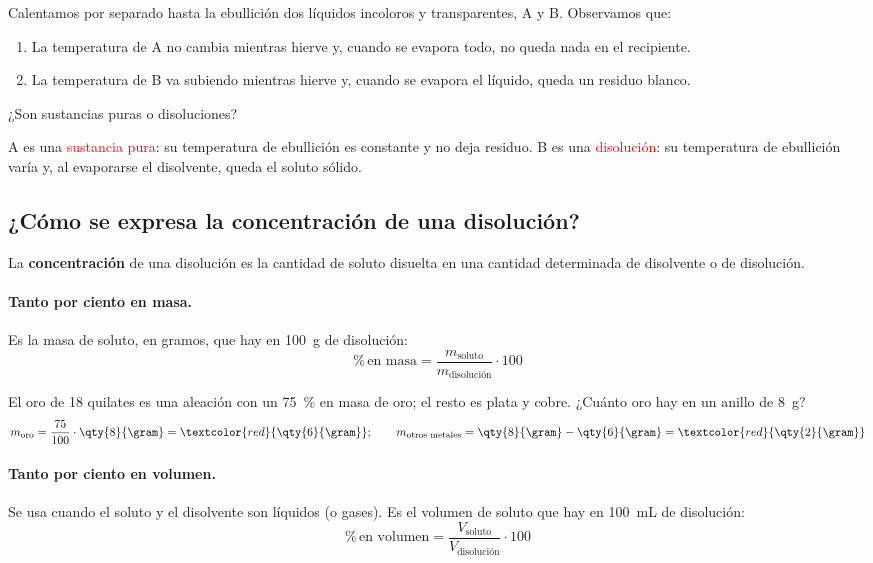 \begin{exercise}
    Calentamos por separado hasta la ebullición dos líquidos incoloros y transparentes, A y B. Observamos que:
    \begin{enumerate}[label=\arabic*.]
        \item La temperatura de A no cambia mientras hierve y, cuando se evapora todo, no queda nada en el recipiente.
        \item La temperatura de B va subiendo mientras hierve y, cuando se evapora el líquido, queda un residuo blanco.
    \end{enumerate}
    ¿Son sustancias puras o disoluciones?
    \begin{solu}
        A es una \textcolor{red}{sustancia pura}: su temperatura de ebullición es constante y no deja residuo. B es una \textcolor{red}{disolución}: su temperatura de ebullición varía y, al evaporarse el disolvente, queda el soluto sólido.
    \end{solu}
\end{exercise}

\subsection{¿Cómo se expresa la concentración de una disolución?}

\begin{definition}[Concentración]
    La \textbf{concentración} de una disolución es la cantidad de soluto disuelta en una cantidad determinada de disolvente o de disolución.
\end{definition}

\paragraph{Tanto por ciento en masa.} Es la masa de soluto, en gramos, que hay en \qty{100}{\gram} de disolución:
\[ \%\,\text{en masa} = \frac{m_\text{soluto}}{m_\text{disolución}} \cdot 100 \]

\begin{example}
    El oro de 18 quilates es una aleación con un \qty{75}{\percent} en masa de oro; el resto es plata y cobre. ¿Cuánto oro hay en un anillo de \qty{8}{\gram}?
    \[ m_\text{oro} = \frac{75}{100} \cdot \qty{8}{\gram} = \textcolor{red}{\qty{6}{\gram}}; \qquad m_\text{otros metales} = \qty{8}{\gram} - \qty{6}{\gram} = \textcolor{red}{\qty{2}{\gram}} \]
\end{example}

\paragraph{Tanto por ciento en volumen.} Se usa cuando el soluto y el disolvente son líquidos (o gases). Es el volumen de soluto que hay en \qty{100}{\mL} de disolución:
\[ \%\,\text{en volumen} = \frac{V_\text{soluto}}{V_\text{disolución}} \cdot 100 \]

